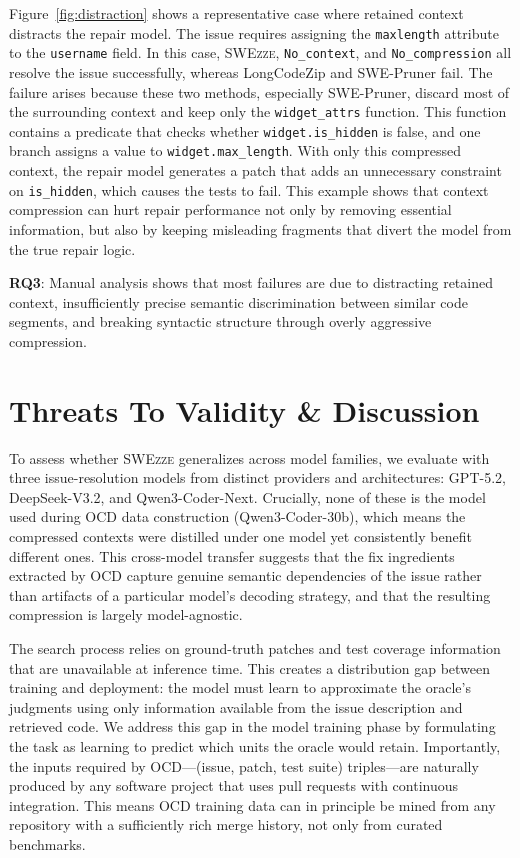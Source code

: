 \documentclass[sigconf,nonacm]{acmart}
\newcommand{\projName}{\textsc{SWEzze}\xspace}
\begin{document}
Figure~\ref{fig:distraction} shows a representative case where retained context distracts the repair model. The issue requires assigning the \texttt{maxlength} attribute to the \texttt{username} field. In this case, \projName, \texttt{No\_context}, and \texttt{No\_compression} all resolve the issue successfully, whereas LongCodeZip and SWE-Pruner fail. The failure arises because these two methods, especially SWE-Pruner, discard most of the surrounding context and keep only the \texttt{widget\_attrs} function. This function contains a predicate that checks whether \texttt{widget.is\_hidden} is false, and one branch assigns a value to \texttt{widget.max\_length}. With only this compressed context, the repair model generates a patch that adds an unnecessary constraint on \texttt{is\_hidden}, which causes the tests to fail. This example shows that context compression can hurt repair performance not only by removing essential information, but also by keeping misleading fragments that divert the model from the true repair logic.

\begin{tcolorbox}[colback=gray!5, colframe=black!20, arc=2pt, boxrule=0.3mm, breakable, sharp corners, left=2pt, right=2pt, top=2pt, bottom=2pt]
\textbf{RQ3}: Manual analysis shows that most failures are due to distracting retained context, insufficiently precise semantic discrimination between similar code segments, and breaking syntactic structure through overly aggressive compression.
\end{tcolorbox}

\section{Threats To Validity \& Discussion}
\label{sec:data_discussion}

To assess whether \projName generalizes across model families, we evaluate with three issue-resolution models from distinct providers and architectures: GPT-5.2, DeepSeek-V3.2, and Qwen3-Coder-Next. Crucially, none of these is the model used during OCD data construction (Qwen3-Coder-30b), which means the compressed contexts were distilled under one model yet consistently benefit different ones. This cross-model transfer suggests that the fix ingredients extracted by OCD capture genuine semantic dependencies of the issue rather than artifacts of a particular model's decoding strategy, and that the resulting compression is largely model-agnostic.

The search process relies on ground-truth patches and test coverage information that are unavailable at inference time. This creates a distribution gap between training and deployment: the model must learn to approximate the oracle's judgments using only information available from the issue description and retrieved code. We address this gap in the model training phase by formulating the task as learning to predict which units the oracle would retain. Importantly, the inputs required by OCD---(issue, patch, test suite) triples---are naturally produced by any software project that uses pull requests with continuous integration. This means OCD training data can in principle be mined from any repository with a sufficiently rich merge history, not only from curated benchmarks.
\end{document}
